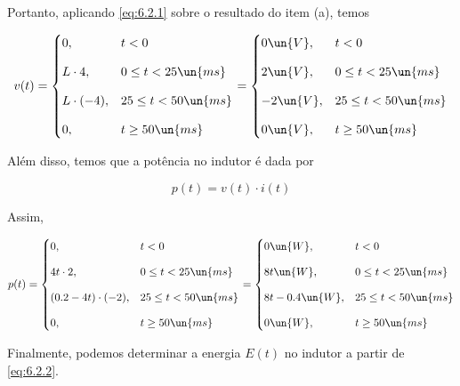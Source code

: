Portanto, aplicando \eqref{eq:6.2.1} sobre o resultado do item (a), temos

\[ v(t) =
    \begin{cases}
        0,   & t < 0                 \\
        \noalign{\vskip9pt}
        L \cdot 4,  & 0 \leq t < 25 \un{ms} \\
        \noalign{\vskip9pt}
        L \cdot (-4), & 25 \leq t < 50 \un{ms} \\
        \noalign{\vskip9pt}
        0,   & t \geq 50 \un{ms}
    \end{cases}
    =
    \begin{cases}
        0 \un{V},   & t < 0                 \\
        \noalign{\vskip9pt}
        2 \un{V},  & 0 \leq t < 25 \un{ms} \\
        \noalign{\vskip9pt}
        -2 \un{V}, & 25 \leq t < 50 \un{ms} \\
        \noalign{\vskip9pt}
        0 \un{V},   & t \geq 50 \un{ms}
    \end{cases}
\]

Além disso, temos que a potência no indutor é dada por   

\begin{equation}\label{eq:6.2.2}
    p(t) = v(t) \cdot i(t)
\end{equation}

Assim,

\[ p(t) =
    \begin{cases}
        0,   & t < 0                 \\
        \noalign{\vskip9pt}
        4t \cdot 2,  & 0 \leq t < 25 \un{ms} \\
        \noalign{\vskip9pt}
        (0.2 - 4t)\cdot (-2), & 25 \leq t < 50 \un{ms} \\
        \noalign{\vskip9pt}
        0,   & t \geq 50 \un{ms}
    \end{cases}
    =
    \begin{cases}
        0 \un{W},   & t < 0                 \\
        \noalign{\vskip9pt}
        8t \un{W},  & 0 \leq t < 25 \un{ms} \\
        \noalign{\vskip9pt}
        8t - 0.4 \un{W}, & 25 \leq t < 50 \un{ms} \\
        \noalign{\vskip9pt}
        0 \un{W},   & t \geq 50 \un{ms}
    \end{cases}
\]

Finalmente, podemos determinar a energia $E(t)$ no indutor a partir de \eqref{eq:6.2.2}.

